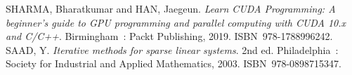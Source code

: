 \begin{thebibliography}{45}
	SHARMA, Bharatkumar and HAN, Jaegeun. \textit{Learn CUDA Programming: A beginner's guide to GPU programming and parallel computing with CUDA 10.x and C/C++}. Birmingham : Packt Publishing, 2019. ISBN 978-1788996242.
	SAAD, Y. \textit{Iterative methods for sparse linear systems}. 2nd ed. Philadelphia : Society for Industrial and Applied Mathematics, 2003. ISBN 978-0898715347.
	
\end{thebibliography}